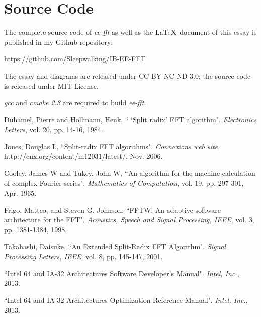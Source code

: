 \documentclass[a4paper]{report}
\begin{document}
\appendix

\chapter{Source Code} \indent

	The complete source code of \textit{ee-fft} as well as the \LaTeX \, document of this essay is published in my Github repository:
	
	\bigskip
	https://github.com/Sleepwalking/IB-EE-FFT
	\bigskip

	The essay and diagrams are released under CC-BY-NC-ND 3.0; the source code is released under MIT License.
	
	\bigskip
	
	\textit{gcc} and \textit{cmake 2.8} are required to build \textit{ee-fft}.

\clearpage
{}
\begin{thebibliography}{9}

  Duhamel, Pierre and Hollmann, Henk,
  `` `Split radix' FFT algorithm".
  \emph{Electronics Letters},
  vol. 20, pp. 14-16,
  1984.

  Jones, Douglas L,
  ``Split-radix FFT algorithms".
  \emph{Connexions web site},
  http://cnx.org/content/m12031/latest/,
  Nov. 2006.

  Cooley, James W and Tukey, John W,
  ``An algorithm for the machine calculation of complex Fourier series".
  \emph{Mathematics of Computation},
  vol. 19, pp. 297-301,
  Apr. 1965.

  Frigo, Matteo, and Steven G. Johnson,
  ``FFTW: An adaptive software architecture for the FFT".
  \emph{Acoustics, Speech and Signal Processing, IEEE},
  vol. 3, pp. 1381-1384,
  1998.

  Takahashi, Daisuke,
  ``An Extended Split-Radix FFT Algorithm".
  \emph{Signal Processing Letters, IEEE},
  vol. 8, pp. 145-147,
  2001.

  ``Intel 64 and IA-32 Architectures Software Developer’s Manual".
  \emph{Intel, Inc.},
  2013.

  ``Intel 64 and IA-32 Architectures Optimization Reference Manual".
  \emph{Intel, Inc.},
  2013.

\end{thebibliography}
\end{document}
